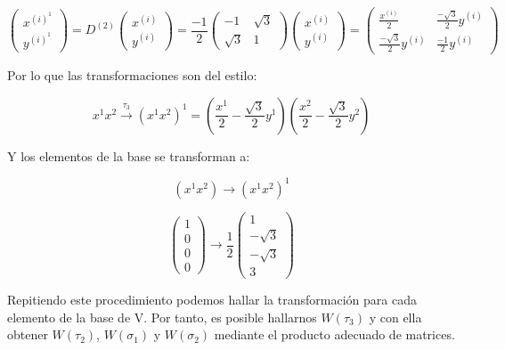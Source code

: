 \documentclass{article}
\begin{document}
\begin{enumerate}
\begin{enumerate}
        $$\left ( \begin{array}{c}
             x^{(i)^1}  \\
               y^{(i)^1}
        \end{array}\right) = D^{(2)} \left ( \begin{array}{c}
             x^{(i)}  \\
               y^{(i)}
        \end{array}\right)=\frac{-1}{2}\left ( \begin{array}{cc}
            -1 & \sqrt{3} \\
               \sqrt{3} & 1
        \end{array}\right)\left ( \begin{array}{c}
             x^{(i)}  \\
               y^{(i)}
        \end{array}\right)= \left ( \begin{array}{cc}
             \frac{x^{(i)}}{2} & \frac{-\sqrt{3}}{2}y^{(i)}  \\
             \frac{-\sqrt{3}}{2}y^{(i)}  & \frac{-1}{2}y^{(i)}
        \end{array}\right)$$
        
        Por lo que las transformaciones son del estilo:
        
        $$x^1x^2 \overset{\tau _3}{\longrightarrow} (x^1 x^2)^1=\left ( \frac{x^1}{2}-\frac{\sqrt{3}}{2}y^1 \right) \left ( \frac{x^2}{2}-\frac{\sqrt{3}}{2}y^2 \right)$$
        
        Y los elementos de la base se transforman a:
        
        $$(x^1x^2) \longrightarrow (x^1x^2)^1$$
        
        $$\left( \begin{array}{c}
             1  \\
             0 \\
             0 \\
             0
        \end{array} \right )\longrightarrow \frac{1}{2} \left( \begin{array}{c}
             1  \\
             -\sqrt{3} \\
             -\sqrt{3}\\
             3
        \end{array} \right )$$
        
        Repitiendo este procedimiento podemos hallar la transformación para cada elemento de la base de V. Por tanto, es posible hallarnos $W(\tau _3)$ y con ella obtener $W(\tau _2)$, $W(\sigma _1)$ y $W(\sigma _2)$ mediante el producto adecuado de matrices.
    \end{enumerate}
\end{enumerate}
  
\end{document}

